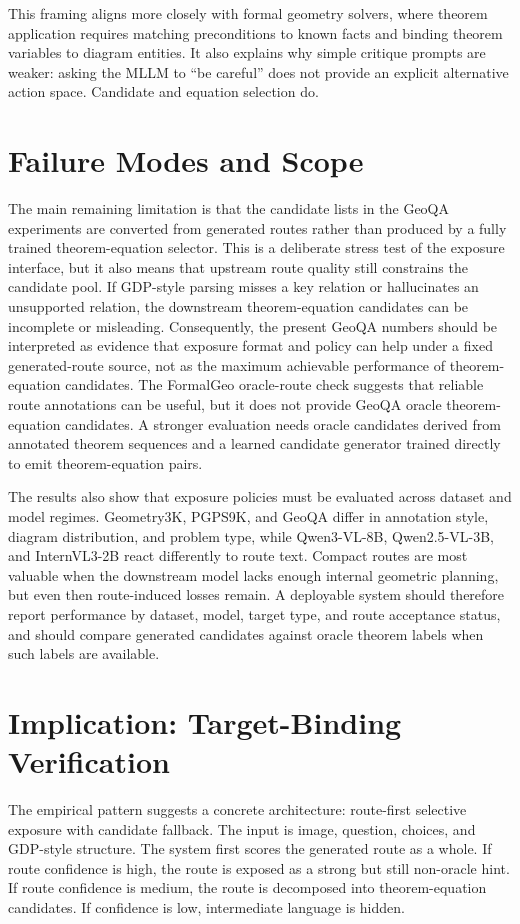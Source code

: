 \documentclass[11pt]{article}
\begin{document}
This framing aligns more closely with formal geometry solvers, where theorem application requires matching preconditions to known facts and binding theorem variables to diagram entities. It also explains why simple critique prompts are weaker: asking the MLLM to ``be careful'' does not provide an explicit alternative action space. Candidate and equation selection do.

\section{Failure Modes and Scope}
The main remaining limitation is that the candidate lists in the GeoQA experiments are converted from generated routes rather than produced by a fully trained theorem-equation selector. This is a deliberate stress test of the exposure interface, but it also means that upstream route quality still constrains the candidate pool. If GDP-style parsing misses a key relation or hallucinates an unsupported relation, the downstream theorem-equation candidates can be incomplete or misleading. Consequently, the present GeoQA numbers should be interpreted as evidence that exposure format and policy can help under a fixed generated-route source, not as the maximum achievable performance of theorem-equation candidates. The FormalGeo oracle-route check suggests that reliable route annotations can be useful, but it does not provide GeoQA oracle theorem-equation candidates. A stronger evaluation needs oracle candidates derived from annotated theorem sequences and a learned candidate generator trained directly to emit theorem-equation pairs.

The results also show that exposure policies must be evaluated across dataset and model regimes. Geometry3K, PGPS9K, and GeoQA differ in annotation style, diagram distribution, and problem type, while Qwen3-VL-8B, Qwen2.5-VL-3B, and InternVL3-2B react differently to route text. Compact routes are most valuable when the downstream model lacks enough internal geometric planning, but even then route-induced losses remain. A deployable system should therefore report performance by dataset, model, target type, and route acceptance status, and should compare generated candidates against oracle theorem labels when such labels are available.

\section{Implication: Target-Binding Verification}
The empirical pattern suggests a concrete architecture: route-first selective exposure with candidate fallback. The input is image, question, choices, and GDP-style structure. The system first scores the generated route as a whole. If route confidence is high, the route is exposed as a strong but still non-oracle hint. If route confidence is medium, the route is decomposed into theorem-equation candidates. If confidence is low, intermediate language is hidden.
\end{document}
